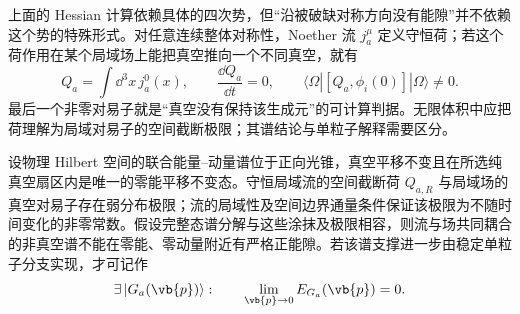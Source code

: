 上面的 Hessian 计算依赖具体的四次势，但“沿被破缺对称方向没有能隙”并不依赖这个势的特殊形式。对任意连续整体对称性，Noether 流 \(j_a^\mu\) 定义守恒荷；若这个荷作用在某个局域场上能把真空推向一个不同真空，就有
\begin{equation}
{
 Q_a=\int\dd^3 x\,j_a^0(x),
 \qquad
 \frac{\dd Q_a}{\dd t}=0,
 \qquad
 \langle\Omega|[Q_a,\phi_i(0)]|\Omega\rangle\neq0.}
\label{eq:goldstone-broken-charge-dp68}
\end{equation}
最后一个非零对易子就是“真空没有保持该生成元”的可计算判据。无限体积中应把荷理解为局域对易子的空间截断极限；其谱结论与单粒子解释需要区分。
\begin{theorem}[守恒局域荷的无能隙判据]
设物理 Hilbert 空间的联合能量--动量谱位于正向光锥，真空平移不变且在所选纯真空扇区内是唯一的零能平移不变态。守恒局域流的空间截断荷 $Q_{a,R}$ 与局域场的真空对易子存在弱分布极限；流的局域性及空间边界通量条件保证该极限为不随时间变化的非零常数。假设完整态谱分解与这些涂抹及极限相容，则流与场共同耦合的非真空谱不能在零能、零动量附近有严格正能隙。若该谱支撑进一步由稳定单粒子分支实现，才可记作
\begin{equation}
{
 \exists\,|G_a(\vb{p})\rangle:
 \qquad
 \lim_{\vb{p}\to0}E_{G_a}(\vb{p})=0.}
\label{eq:goldstone-gapless-spectrum-dp68}
\end{equation}
\end{theorem}
